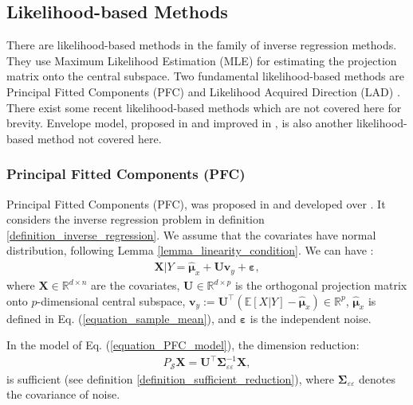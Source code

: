 \documentclass[lang=cn,10pt]{gorgeousnbook}
\numberwithin{equation}{section}%
\numberwithin{figure}{section}%
\begin{document}
\subsection{Likelihood-based Methods}

There are likelihood-based methods in the family of inverse regression methods. They use Maximum Likelihood Estimation (MLE) for estimating the projection matrix onto the central subspace. 
Two fundamental likelihood-based methods are Principal Fitted Components (PFC) \cite{cook2007fisher,cook2008principal} and Likelihood Acquired Direction (LAD) \cite{cook2009likelihood}. There exist some recent likelihood-based methods \cite{bura2015sufficient,bura2016sufficient} which are not covered here for brevity.
Envelope model, proposed in \cite{cook2010envelope} and improved in \cite{zhang2018functional,zhang2020principal}, is also another likelihood-based method not covered here. 

\subsubsection{Principal Fitted Components (PFC)}

Principal Fitted Components (PFC), was proposed in \cite{cook2008principal} and developed over \cite{cook2007fisher}.
It considers the inverse regression problem in definition \ref{definition_inverse_regression}. 
We assume that the covariates have normal distribution, following Lemma \ref{lemma_linearity_condition}.
We can have \cite{cook2007fisher,cook2008principal}:
\begin{align}\label{equation_PFC_model}
\boldsymbol{X} | Y = \widehat{\boldsymbol{\mu}}_x + \boldsymbol{U} \boldsymbol{v}_y + \boldsymbol{\varepsilon},
\end{align}
where $\boldsymbol{X} \in \mathbb{R}^{d \times n}$ are the covariates, $\boldsymbol{U} \in \mathbb{R}^{d \times p}$ is the orthogonal projection matrix onto $p$-dimensional central subspace, $\boldsymbol{v}_y := \boldsymbol{U}^\top (\mathbb{E}[X|Y] - \widehat{\boldsymbol{\mu}}_x) \in \mathbb{R}^p$, $\widehat{\boldsymbol{\mu}}_x$ is defined in Eq. (\ref{equation_sample_mean}), and $\boldsymbol{\varepsilon}$ is the independent noise. 

\begin{lemma}
In the model of Eq. (\ref{equation_PFC_model}), the dimension reduction:
\begin{align}\label{equation_PFC_projection}
P_\mathcal{S}\boldsymbol{X} = \boldsymbol{U}^\top \boldsymbol{\Sigma}_{\varepsilon\varepsilon}^{-1} \boldsymbol{X},
\end{align}
is sufficient (see definition \ref{definition_sufficient_reduction}), where $\boldsymbol{\Sigma}_{\varepsilon\varepsilon}$ denotes the covariance of noise. 
\end{lemma}
\end{document}
